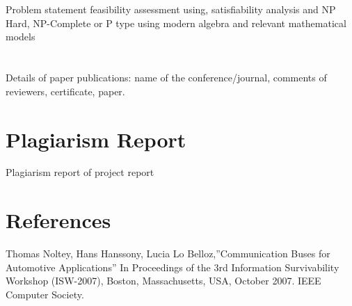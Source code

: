 \documentclass[oneside,a4paper,12pt]{report}
\begin{document}
\begin{appendices}


\chapter{}
Problem statement feasibility assessment using, satisfiability analysis and NP Hard, NP-Complete or P type using modern algebra and relevant mathematical models








\chapter{ }
Details of paper publications: name of the conference/journal, comments of reviewers, certificate, paper. 

\chapter{Plagiarism Report}
Plagiarism report of project report


\chapter{References}
Thomas Noltey, Hans Hanssony, Lucia Lo Belloz,”Communication Buses for Automotive Applications” In Proceedings of the 3rd Information Survivability Workshop (ISW-2007), Boston, Massachusetts, USA, October 2007. IEEE Computer Society.

\end{appendices}
\end{document}
